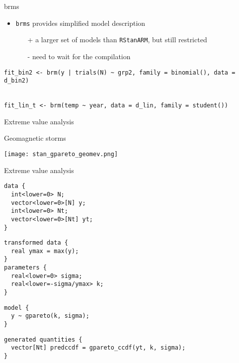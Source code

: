 \documentclass[finnish,english,t]{beamer}
\begin{document}
\begin{frame}[fragile]{brms}

  \begin{itemize}
  \item \texttt{brms} provides simplified model description
    \begin{itemize}
    \item[+] a larger set of models than \texttt{RStanARM}, but still restricted
    \item[-] need to wait for the compilation
    \end{itemize}
  \end{itemize}

  {\footnotesize
\begin{verbatim}
fit_bin2 <- brm(y | trials(N) ~ grp2, family = binomial(), data = d_bin2)


fit_lin_t <- brm(temp ~ year, data = d_lin, family = student())
\end{verbatim}
  }
    
\end{frame} 

\begin{frame}{Extreme value analysis}

  \vspace{-0.5\baselineskip}
Geomagnetic storms

\texttt{[image: stan\_gpareto\_geomev.png]}  

\end{frame}

\begin{frame}[fragile]{Extreme value analysis}
  
  {\footnotesize
    {
  \begin{verbatim}
data {
  int<lower=0> N;
  vector<lower=0>[N] y;
  int<lower=0> Nt;
  vector<lower=0>[Nt] yt;
}
\end{verbatim}
    }
    \vspace{-1.5\baselineskip}
    {
\begin{verbatim}
transformed data {
  real ymax = max(y);
}
parameters {
  real<lower=0> sigma; 
  real<lower=-sigma/ymax> k; 
}
\end{verbatim}
    }
    \vspace{-1.5\baselineskip}
    {
\begin{verbatim}
model {
  y ~ gpareto(k, sigma);
}
\end{verbatim}
    }
    \vspace{-1.5\baselineskip}
    {
\begin{verbatim}
generated quantities {
  vector[Nt] predccdf = gpareto_ccdf(yt, k, sigma);
}
  \end{verbatim}
  }
}  
\end{frame} 
\end{document}
